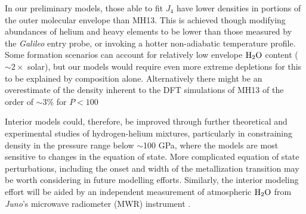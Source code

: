 In our preliminary models, those able to fit $J_4$ have lower densities in
portions of the outer molecular envelope than MH13. This is achieved though
modifying abundances of helium and heavy elements to be lower than those measured by
the \textit{Galileo} entry probe, or invoking a hotter non-adiabatic
temperature profile. Some formation scenarios \citep[e.g.][]{Mousis2012} can
account for relatively low envelope ${\rm H}_2{\rm O}$ content ($\sim2\times$
solar), but our models would require even more extreme depletions for this
to be explained by composition alone.  Alternatively there might be an
overestimate of the density inherent to the DFT simulations of MH13 of the
order of $\sim$3\% for $P<100$

Interior models could, therefore, be improved through further theoretical and
experimental studies of hydrogen-helium mixtures, particularly in constraining
density in the pressure range below $\sim$100 GPa, where the models are most
sensitive to changes in the equation of state. More complicated equation of state
perturbations, including the onset and width of the metallization transition
\citep{Knudson2017} may be worth considering in future modelling efforts.
Similarly, the interior modeling effort will be aided by an independent
measurement of atmospheric ${\rm H}_2{\rm O}$ from \textit{Juno}'s microwave
radiometer (MWR) instrument \citep{helled2014b}.







